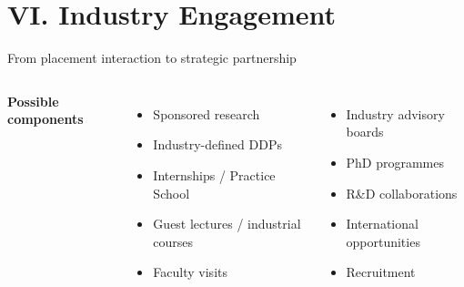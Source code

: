 \documentclass[aspectratio=169,11pt]{beamer}
\begin{document}
\section{VI. Industry Engagement}
\begin{frame}{From placement interaction to strategic partnership}
\begin{center}
\end{center}
\vspace{5mm}
\begin{columns}[T]
\textbf{Possible components}
\begin{itemize}
\item Sponsored research
\item Industry-defined DDPs
\item Internships / Practice School
\item Guest lectures / industrial courses
\item Faculty visits
\end{itemize}
\begin{itemize}
\item Industry advisory boards
\item PhD programmes
\item R\&D collaborations
\item International opportunities
\item Recruitment
\end{itemize}
\end{columns}
\end{frame}
\end{document}
